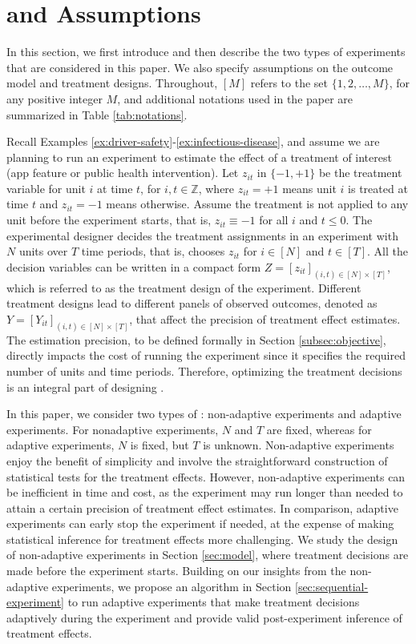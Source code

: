 \section{ and Assumptions}\label{sec:experiment-outcome-estimand}
    In this section, we first introduce  and then describe the two types of experiments that are considered in this paper. We also specify assumptions on the outcome model and treatment designs. Throughout, $[M]$ refers to the set $\{1, 2, \ldots, M\}$, for any positive integer $M$, {and additional notations used in the paper are summarized in Table \ref{tab:notations}}.
    

    Recall Examples \ref{ex:driver-safety}-\ref{ex:infectious-disease}, and assume
    we are planning to run an experiment to estimate the effect of a treatment of interest (app feature or public health intervention). 
    Let $z_{it}$ in $\{-1,+1\}$ be the treatment variable for unit $i$ at time $t$, for $i, t \in \mathbb{Z}$, where $z_{it} = +1$ means unit $i$ is treated at time $t$ and $z_{it} = -1$ means otherwise. Assume the treatment is not applied to any unit before the experiment starts, that is, $z_{it} \equiv -1$ for all $i$ and $t \leq 0$. The experimental designer decides the treatment assignments in an experiment with $N$ units over $T$ time periods, that is, chooses $z_{it}$ for $i \in [N]$ and $t \in [T]$. All the decision variables can be written in a compact form $Z = [z_{it}]_{(i,t)\in [N] \times [T]}$, which is referred to as the treatment design of the experiment. Different treatment designs lead to different panels of observed outcomes, denoted as $Y = [Y_{it}]_{(i,t)\in [N] \times [T]}$, that affect the precision of treatment effect estimates. The estimation precision, to be defined formally in Section \ref{subsec:objective}, directly impacts the cost of running the experiment since it specifies the required number of units and time periods. Therefore, optimizing the treatment decisions is an integral part of designing .
    
    In this paper, we consider two types of : non-adaptive experiments and adaptive experiments. For nonadaptive experiments, $N$ and $T$ are fixed, whereas for adaptive experiments, $N$ is fixed, but $T$ is unknown. Non-adaptive experiments enjoy the benefit of simplicity and involve the straightforward construction of statistical tests for the treatment effects. However, non-adaptive experiments can be inefficient in time and cost, as the experiment may run longer than needed to attain a certain precision of treatment effect estimates. In comparison, adaptive experiments can early stop the experiment if needed, at the expense of making statistical inference for treatment effects more challenging. We study the design of non-adaptive experiments in Section \ref{sec:model}, where treatment decisions are made before the experiment starts. Building on our insights from the non-adaptive experiments, we propose an algorithm in Section \ref{sec:sequential-experiment} to run adaptive experiments that make treatment decisions adaptively during the experiment and provide valid post-experiment inference of treatment effects.
    
